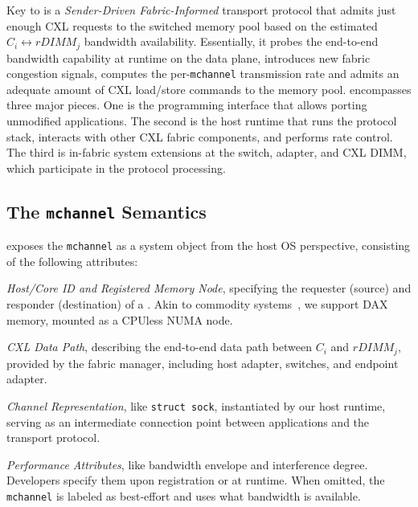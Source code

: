 Key to \sys is a {\it Sender-Driven Fabric-Informed} transport protocol that admits just enough CXL requests to the switched memory pool based on the estimated $C_i \leftrightarrow rDIMM_j$ bandwidth availability.
Essentially, it probes the end-to-end bandwidth capability at runtime on the data plane, introduces new fabric congestion signals, computes the per-\texttt{mchannel} transmission rate
and admits an adequate amount of CXL load/store commands to the memory pool. \sys encompasses three major pieces. One is the programming interface that allows porting unmodified applications.
The second is the host runtime that runs the protocol stack, interacts with other CXL fabric components, and performs rate control. The third is in-fabric system extensions at the switch, adapter, and CXL DIMM, which participate in the protocol processing.

\subsection{The \texttt{mchannel} Semantics}
\label{subsec:mchannel-semantics}

\sys exposes the \texttt{mchannel} as a system object from the host OS perspective, consisting of the following attributes:

\squishlist
    \item {\it Host/Core ID and Registered Memory Node}, specifying the requester (source) and responder (destination) of a \sys. Akin to commodity systems~\cite{omega-fabric, unifabrix-max, samsung-cmmb}, we support DAX memory, mounted as a CPUless NUMA node.

    \item {\it CXL Data Path}, describing the end-to-end data path between $C_i$ and $rDIMM_j$, provided by the fabric manager, including host adapter, switches, and endpoint adapter.
    
    \item {\it Channel Representation}, like \texttt{struct sock}, instantiated by our host runtime, serving as an intermediate connection point between applications and the transport protocol.  
    
    \item {\it Performance Attributes}, like bandwidth envelope and interference degree. Developers specify them upon registration or at runtime. When omitted, the \texttt{mchannel} is labeled as best-effort and uses what bandwidth is available.

